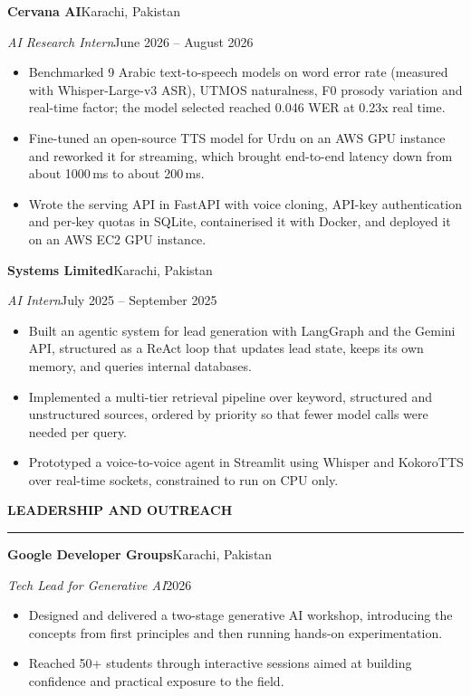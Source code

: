 \documentclass[11pt,letterpaper]{article}
\newcommand{\cvsection}[1]{%
  \Needspace*{6\baselineskip}%
  \vspace{1.0em}%
  {\bfseries\uppercase{#1}}\par
  \vspace{0.15em}\hrule\vspace{0.5em}%
}
\newenvironment{entrybox}
  {\par\vspace{0.5em}\noindent\begin{minipage}{\linewidth}}
  {\end{minipage}\par}
\newcommand{\orgline}[2]{\textbf{#1}\hfill #2\par}
\newcommand{\roleline}[2]{\textit{#1}\hfill #2\par\vspace{0.15em}}
\begin{document}
\begin{entrybox}
  \orgline{Cervana AI}{Karachi, Pakistan}
  \roleline{AI Research Intern}{June 2026 -- August 2026}
  \begin{itemize}
    \item Benchmarked 9 Arabic text-to-speech models on word error rate (measured with
          Whisper-Large-v3 ASR), UTMOS naturalness, F0 prosody variation and real-time factor;
          the model selected reached 0.046 WER at 0.23x real time.
    \item Fine-tuned an open-source TTS model for Urdu on an AWS GPU instance and reworked it for
          streaming, which brought end-to-end latency down from about 1000\,ms to about
          200\,ms.
    \item Wrote the serving API in FastAPI with voice cloning, API-key authentication and
          per-key quotas in SQLite, containerised it with Docker, and deployed it on an AWS EC2
          GPU instance.
  \end{itemize}
\end{entrybox}

\begin{entrybox}
  \orgline{Systems Limited}{Karachi, Pakistan}
  \roleline{AI Intern}{July 2025 -- September 2025}
  \begin{itemize}
    \item Built an agentic system for lead generation with LangGraph and the Gemini API,
          structured as a ReAct loop that updates lead state, keeps its own memory, and queries
          internal databases.
    \item Implemented a multi-tier retrieval pipeline over keyword, structured and unstructured
          sources, ordered by priority so that fewer model calls were needed per query.
    \item Prototyped a voice-to-voice agent in Streamlit using Whisper and KokoroTTS over
          real-time sockets, constrained to run on CPU only.
  \end{itemize}
\end{entrybox}

\clearpage
\cvsection{Leadership and Outreach}

\begin{entrybox}
  \orgline{Google Developer Groups}{Karachi, Pakistan}
  \roleline{Tech Lead for Generative AI}{2026}
  \begin{itemize}
    \item Designed and delivered a two-stage generative AI workshop, introducing the concepts from
          first principles and then running hands-on experimentation.
    \item Reached 50+ students through interactive sessions aimed at building confidence and
          practical exposure to the field.
  \end{itemize}
\end{entrybox}
\end{document}
